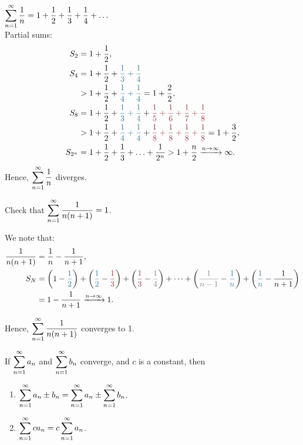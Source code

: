 \begin{ex}
    $\displaystyle\sum_{n=1}^\infty \dfrac{1}{n} = 1 + \dfrac{1}{2} + \dfrac{1}{3} + \dfrac{1}{4} + \ldots$ \\
    Partial sums:
    \begin{align*}
        S_2 &= 1 + \dfrac{1}{2}, \\
        S_4 &= 1 + \dfrac{1}{2} + \blue{\dfrac{1}{3} + \dfrac{1}{4}} \\
        &> 1 + \dfrac{1}{2} + \blue{\dfrac{1}{4} + \dfrac{1}{4}} = 1+\dfrac{2}{2}, \\
        S_8 &= 1 + \dfrac{1}{2} + \blue{\dfrac{1}{3} + \dfrac{1}{4}} + \red{\dfrac{1}{5} + \dfrac{1}{6} + \dfrac{1}{7} + \dfrac{1}{8}}\\
        &> 1 + \dfrac{1}{2} + \blue{\dfrac{1}{4} + \dfrac{1}{4}} + \red{\dfrac{1}{8} + \dfrac{1}{8} + \dfrac{1}{8} + \dfrac{1}{8}} = 1+\dfrac{3}{2}, \\
        S_{2^n} &= 1 + \dfrac{1}{2} + \dfrac{1}{3} + \ldots + \dfrac{1}{2^n} > 1+\dfrac{n}{2} \xrightarrow{n \to \infty} \infty.
    \end{align*}
    Hence, $\displaystyle\sum_{n=1}^\infty \dfrac{1}{n}$ diverges.    
\end{ex}

\begin{ex}
    Check that $\displaystyle\sum_{n=1}^\infty \dfrac{1}{n(n+1)} = 1$.

    We note that:
    \begin{align*}
        \dfrac{1}{n(n+1)} &= \dfrac{1}{n} - \dfrac{1}{n+1}, \\
        S_N &= \left(1 - \blue{\dfrac{1}{2}}\right) + \left(\blue{\dfrac{1}{2}} - \red{\dfrac{1}{3}}\right) + \left(\red{\dfrac{1}{3}} - \gray{\dfrac{1}{4}}\right) + \cdots + \left(\gray{\dfrac{1}{n-1}} - \blue{\dfrac{1}{n}}\right) + \left(\blue{\dfrac{1}{n}} - \dfrac{1}{n+1}\right)\\
        &= 1 - \dfrac{1}{n+1} \xrightarrow{n \to \infty} 1.
    \end{align*}
    
    Hence, $\displaystyle\sum_{n=1}^\infty \dfrac{1}{n(n+1)}$ converges to 1.
\end{ex}



\begin{thm}
    If $\displaystyle\sum_{n=1}^\infty a_n$ and $\displaystyle\sum_{n=1}^\infty b_n$ converge, and $c$ is a constant, then 
\begin{enumerate}
    \item $\displaystyle\sum_{n=1}^\infty a_n \pm b_n = \displaystyle\sum_{n=1}^\infty a_n \pm \displaystyle\sum_{n=1}^\infty b_n$.
    
    \item $\displaystyle\sum_{n=1}^\infty c a_n = c \displaystyle\sum_{n=1}^\infty a_n$.
\end{enumerate}
\end{thm}

